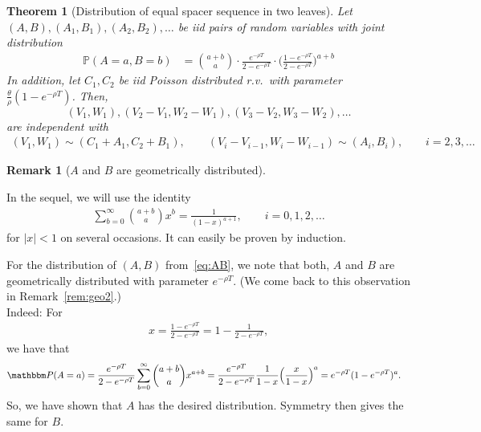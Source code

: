 \documentclass[preprint,authoryear]{elsarticle}
\newtheorem{theorem}{Theorem}
\theoremstyle{definition}
\newtheorem{remark}[proposition]{Remark}
\numberwithin{equation}{section}
\numberwithin{figure}{section}
\begin{document}
\begin{theorem}[Distribution of equal spacer sequence in two leaves\label{T:1}]
  Let $(A,B), (A_1, B_1), (A_2, B_2),\dots$ be iid pairs of random
  variables with joint distribution
  \begin{align}\label{eq:AB}
    \mathbb P(A=a, B=b) & = \binom{a+b}{a} \cdot \frac{e^{- \rho T}}{2-e^{-\rho T}} 
                          \cdot \bigg( \frac{1-e^{- \rho T}}{2-e^{-\rho T}}  \bigg)^{a+b}
  \end{align}
  In addition, let $C_{\mathfrak 1}, C_{\mathfrak 2}$ be iid Poisson
  distributed r.v.\ with parameter $\frac\theta\rho(1-e^{-\rho T})$.
  Then, 
  $$(V_1, W_1), (V_2-V_1, W_2-W_1), (V_3-V_2, W_3-W_2),\dots$$ are
  independent with
  \begin{align*}
    (V_1, W_1) \sim (C_{\mathfrak 1} + A_1, C_{\mathfrak 2} + B_1), \qquad
    (V_i-V_{i-1}, W_i-W_{i-1}) \sim (A_i, B_i), \qquad i=2,3,\dots
  \end{align*}
\end{theorem}


\begin{remark}[$A$ and $B$ are geometrically
  distributed\label{rem:geo1}]
  \begin{asparaenum}
    \item In the sequel, we will use the identity
      \begin{align}
        \label{eq:sumx}
        \sum_{b=0}^\infty \binom{a+b}{a} x^b = \frac{1}{(1-x)^{a+1}}, \qquad i=0,1,2,\dots
      \end{align}
      for $|x|<1$ on several occasions. It can easily be proven by
      induction.
    \item For the distribution of $(A, B)$ from~\eqref{eq:AB}, we note
      that both, $A$ and $B$ are geometrically distributed with
      parameter
      $e^{-\rho T}$. (We come back to this observation in Remark~\ref{rem:geo2}.)\\
      Indeed: For
      \begin{align}
        \label{def:x}
        x = \frac{1-e^{-\rho T}}{2-e^{-\rho T}} = 1 - \frac{1}{2-e^{-\rho T}},
      \end{align}
      we have that
      \begin{align*}
        \mathbbm P(A=a) & = \frac{e^{- \rho T}}{2-e^{-\rho T}}
                          \sum_{b=0}^\infty \binom{a+b}{a} x^{a+b}
                          = \frac{e^{-\rho T}}{2-e^{-\rho T}} \frac{1}{1-x}\Big(\frac{x}{1-x}\Big)^{a}
                          = e^{-\rho T}(1-e^{-\rho T})^a.
      \end{align*}
      So, we have shown that $A$ has the desired distribution. Symmetry
      then gives the same for $B$.
    \end{asparaenum}
\end{remark}
\end{document}
